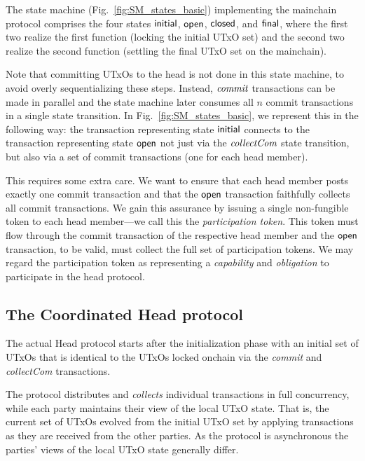 

The state machine (Fig.~\ref{fig:SM_states_basic}) implementing
the mainchain protocol comprises the four states $\mathsf{initial}$,
$\mathsf{open}$, $\mathsf{closed}$, and $\mathsf{final}$, where the first two realize
the first function (locking the initial UTxO set) and the
second two realize the second function (settling the final UTxO set on
the mainchain).

Note that committing UTxOs to the head is not done in this state machine, to avoid overly sequentializing these steps. Instead, $\textit{commit}$ transactions can be made in parallel and the state machine later
consumes all $n$ commit transactions in a single state transition. In
Fig.~\ref{fig:SM_states_basic}, we represent this in the following way: the
transaction representing state $\mathsf{initial}$ connects to the transaction
representing state $\mathsf{open}$ not just via the $\textit{collectCom}$ state transition, but
also via a set of commit transactions (one for each head member).

This requires some extra care. We want to ensure that each
head member posts exactly one commit transaction and that the $\mathsf{open}$
transaction faithfully collects all commit
transactions. We gain this assurance by issuing a single non-fungible
token to each head member---we call this the \emph{participation
  token}.  This token must flow through the commit transaction of the
respective head member and the $\mathsf{open}$ transaction, to be valid, must
collect the full set of participation tokens. We may regard the
participation token as representing a \emph{capability} and
\emph{obligation} to participate in the head protocol.


\subsection{The Coordinated Head protocol}\label{sec:overview_hp}

The actual Head protocol starts after the initialization phase with an initial
set of UTxOs that is identical to the UTxOs locked onchain via the \emph{commit}
and \emph{collectCom} transactions.

The protocol distributes and \emph{collects} individual transactions in full concurrency,
while each party maintains their view of the local UTxO state. That is, the current set of UTxOs evolved from the initial UTxO set
by applying transactions as they are received from the other parties.
As the protocol is asynchronous the parties' views of the local UTxO state generally differ.

